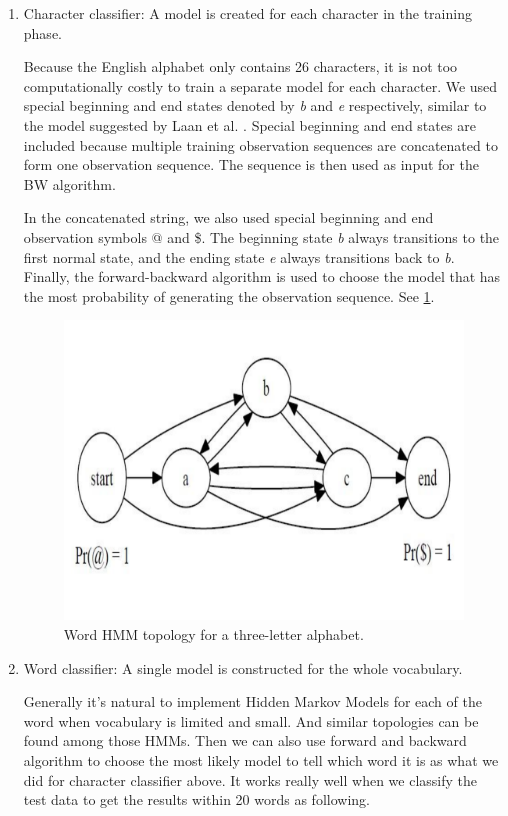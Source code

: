 \begin{enumerate}
\item	Character classifier: A model is created for each character in the training phase.

Because the English alphabet only contains 26 characters, it is not too computationally costly to train a separate model for each character.
We used special beginning and end states denoted by \textit{b} and \textit{e} respectively, similar to the model suggested by Laan et al. \cite{Laan}.
Special beginning and end states are included because multiple training observation sequences are concatenated to form one observation sequence.
The sequence is then used as input for the BW algorithm.

In the concatenated string, we also used special beginning and end observation symbols @ and \$.
The  beginning state   \textit{b} always transitions to the first normal state, and the  ending state \textit{e} always transitions back to \textit{b}.
Finally, the forward-backward algorithm is used to choose the model that has the most probability of generating the observation sequence. 
See \ref{figure:wordtopology}.

\begin{figure}[h!]
\centering
\includegraphics[width=5in]{wordtopology}
\caption{Word HMM topology for a three-letter alphabet.}
\label{figure:wordtopology}
\end{figure}


\item	Word classifier: A single model is constructed for the whole vocabulary. 

Generally it’s natural to implement Hidden Markov Models for each of the word when vocabulary is limited and small. And similar topologies can be found among those HMMs. Then we can also use forward and backward algorithm to choose the most likely model to tell which word it is as what we did for character classifier above. It works really well when we classify the test data to get the results within 20 words as following.


\end{enumerate}
